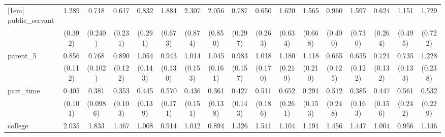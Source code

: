 {\begin{tabular}{l*{16}{c}}
[1em]
public\_servant      &       1.289         &       0.718         &       0.617         &       0.832         &       1.884         &       2.307\sym{*}  &       2.056         &       0.787         &       0.650         &       1.620         &       1.565         &       0.960         &       1.597         &       0.624         &       1.151         &       1.729         \\
                    &     (0.392)         &     (0.240)         &     (0.231)         &     (0.291)         &     (0.673)         &     (0.874)         &     (0.850)         &     (0.297)         &     (0.263)         &     (0.634)         &     (0.668)         &     (0.400)         &     (0.730)         &     (0.264)         &     (0.495)         &     (0.722)         \\
[1em]
parent\_5            &       0.856         &       0.768\sym{*}  &       0.890         &       1.054         &       0.943         &       1.014         &       1.045         &       0.983         &       1.018         &       1.180         &       1.118         &       0.665\sym{*}  &       0.655\sym{*}  &       0.721         &       0.735         &       1.228         \\
                    &     (0.112)         &     (0.102)         &     (0.122)         &     (0.143)         &     (0.130)         &     (0.153)         &     (0.161)         &     (0.157)         &     (0.170)         &     (0.219)         &     (0.210)         &     (0.125)         &     (0.122)         &     (0.132)         &     (0.133)         &     (0.238)         \\
[1em]
part\_time           &       0.405\sym{***}&       0.381\sym{***}&       0.353\sym{***}&       0.445\sym{**} &       0.570         &       0.436\sym{*}  &       0.361\sym{**} &       0.427\sym{*}  &       0.511         &       0.652         &       0.291\sym{*}  &       0.512         &       0.385\sym{*}  &       0.447\sym{*}  &       0.561         &       0.532         \\
                    &     (0.101)         &    (0.0986)         &     (0.103)         &     (0.139)         &     (0.171)         &     (0.151)         &     (0.138)         &     (0.143)         &     (0.186)         &     (0.261)         &     (0.153)         &     (0.248)         &     (0.163)         &     (0.156)         &     (0.242)         &     (0.229)         \\
[1em]
college             &       2.035\sym{***}&       1.833\sym{**} &       1.467         &       1.008         &       0.914         &       1.012         &       0.894         &       1.326         &       1.541         &       1.104         &       1.191         &       1.456         &       1.447         &       1.004         &       0.956         &       1.146         \\

\end{tabular}}
